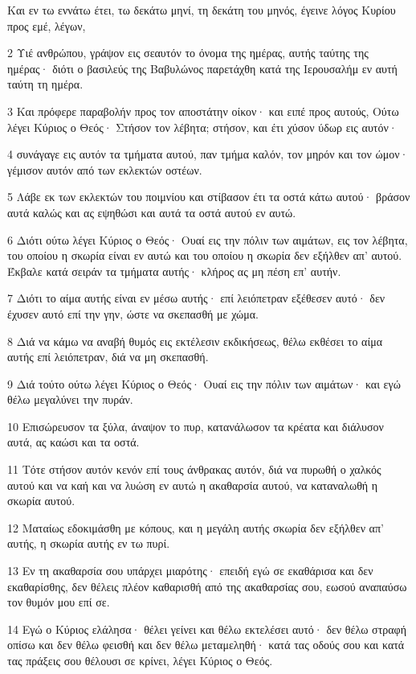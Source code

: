 \par Και εν τω εννάτω έτει, τω δεκάτω μηνί, τη δεκάτη του μηνός, έγεινε λόγος Κυρίου προς εμέ, λέγων,
\par 2 Υιέ ανθρώπου, γράψον εις σεαυτόν το όνομα της ημέρας, αυτής ταύτης της ημέρας· διότι ο βασιλεύς της Βαβυλώνος παρετάχθη κατά της Ιερουσαλήμ εν αυτή ταύτη τη ημέρα.
\par 3 Και πρόφερε παραβολήν προς τον αποστάτην οίκον· και ειπέ προς αυτούς, Ούτω λέγει Κύριος ο Θεός· Στήσον τον λέβητα; στήσον, και έτι χύσον ύδωρ εις αυτόν·
\par 4 συνάγαγε εις αυτόν τα τμήματα αυτού, παν τμήμα καλόν, τον μηρόν και τον ώμον· γέμισον αυτόν από των εκλεκτών οστέων.
\par 5 Λάβε εκ των εκλεκτών του ποιμνίου και στίβασον έτι τα οστά κάτω αυτού· βράσον αυτά καλώς και ας εψηθώσι και αυτά τα οστά αυτού εν αυτώ.
\par 6 Διότι ούτω λέγει Κύριος ο Θεός· Ουαί εις την πόλιν των αιμάτων, εις τον λέβητα, του οποίου η σκωρία είναι εν αυτώ και του οποίου η σκωρία δεν εξήλθεν απ' αυτού. Έκβαλε κατά σειράν τα τμήματα αυτής· κλήρος ας μη πέση επ' αυτήν.
\par 7 Διότι το αίμα αυτής είναι εν μέσω αυτής· επί λειόπετραν εξέθεσεν αυτό· δεν έχυσεν αυτό επί την γην, ώστε να σκεπασθή με χώμα.
\par 8 Διά να κάμω να αναβή θυμός εις εκτέλεσιν εκδικήσεως, θέλω εκθέσει το αίμα αυτής επί λειόπετραν, διά να μη σκεπασθή.
\par 9 Διά τούτο ούτω λέγει Κύριος ο Θεός· Ουαί εις την πόλιν των αιμάτων· και εγώ θέλω μεγαλύνει την πυράν.
\par 10 Επισώρευσον τα ξύλα, άναψον το πυρ, κατανάλωσον τα κρέατα και διάλυσον αυτά, ας καώσι και τα οστά.
\par 11 Τότε στήσον αυτόν κενόν επί τους άνθρακας αυτόν, διά να πυρωθή ο χαλκός αυτού και να καή και να λυώση εν αυτώ η ακαθαρσία αυτού, να καταναλωθή η σκωρία αυτού.
\par 12 Ματαίως εδοκιμάσθη με κόπους, και η μεγάλη αυτής σκωρία δεν εξήλθεν απ' αυτής, η σκωρία αυτής εν τω πυρί.
\par 13 Εν τη ακαθαρσία σου υπάρχει μιαρότης· επειδή εγώ σε εκαθάρισα και δεν εκαθαρίσθης, δεν θέλεις πλέον καθαρισθή από της ακαθαρσίας σου, εωσού αναπαύσω τον θυμόν μου επί σε.
\par 14 Εγώ ο Κύριος ελάλησα· θέλει γείνει και θέλω εκτελέσει αυτό· δεν θέλω στραφή οπίσω και δεν θέλω φεισθή και δεν θέλω μεταμεληθή· κατά τας οδούς σου και κατά τας πράξεις σου θέλουσι σε κρίνει, λέγει Κύριος ο Θεός.
